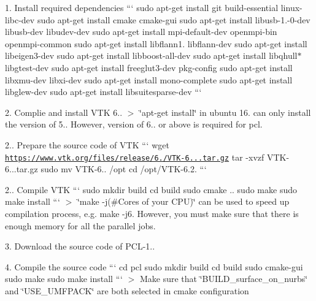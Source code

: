 
\begin{DoxyItemize}
\item 1. Install required dependencies ``` sudo apt-\/get install git build-\/essential linux-\/libc-\/dev sudo apt-\/get install cmake cmake-\/gui sudo apt-\/get install libusb-\/1.-\/0-\/dev libusb-\/dev libudev-\/dev sudo apt-\/get install mpi-\/default-\/dev openmpi-\/bin openmpi-\/common sudo apt-\/get install libflann1. libflann-\/dev sudo apt-\/get install libeigen3-\/dev sudo apt-\/get install libboost-\/all-\/dev sudo apt-\/get install libqhull$\ast$ libgtest-\/dev sudo apt-\/get install freeglut3-\/dev pkg-\/config sudo apt-\/get install libxmu-\/dev libxi-\/dev sudo apt-\/get install mono-\/complete sudo apt-\/get install libglew-\/dev sudo apt-\/get install libsuitesparse-\/dev ```
\item 2. Complie and install V\+TK 6.. $>$ \char`\"{}apt-\/get install\char`\"{} in ubuntu 16. can only install the version of 5.. However, version of 6.. or above is required for pcl.
\begin{DoxyItemize}
\item 2.. Prepare the source code of V\+TK ``` wget \href{https://www.vtk.org/files/release/6.2/VTK-6.2.0.tar.gz}{\tt https\+://www.\+vtk.\+org/files/release/6./\+V\+T\+K-\/6...\+tar.\+gz} tar -\/xvzf V\+T\+K-\/6...\+tar.\+gz sudo mv V\+T\+K-\/6.. /opt cd /opt/\+V\+T\+K-\/6.2. ```
\item 2.. Compile V\+TK ``` sudo mkdir build cd build sudo cmake .. sudo make sudo make install ``` $>$ \char`\"{}make -\/j(\#\+Cores of your C\+P\+U)\char`\"{} can be used to speed up compilation process, e.\+g. make -\/j6. However, you must make sure that there is enough memory for all the parallel jobs.
\end{DoxyItemize}
\item 3. Download the source code of P\+C\+L-\/1..
\item 4. Compile the source code ``` cd pcl sudo mkdir build cd build sudo cmake-\/gui sudo make sudo make install ``` $>$ Make sure that \char`\"{}\+B\+U\+I\+L\+D\+\_\+surface\+\_\+on\+\_\+nurbs\char`\"{} and \char`\"{}\+U\+S\+E\+\_\+\+U\+M\+F\+P\+A\+C\+K\char`\"{} are both selected in cmake configuration 
\end{DoxyItemize}